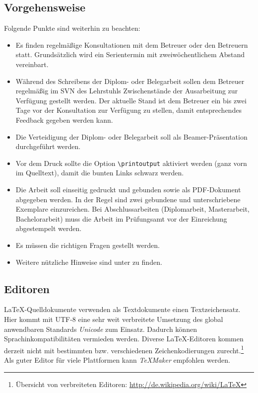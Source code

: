 \subsection{Vorgehensweise}
Folgende Punkte sind weiterhin zu beachten:
\begin{itemize}
	\item Es finden regelmäßige Konsultationen mit dem Betreuer oder den Betreuern statt. Grundsätzlich wird ein Serientermin mit zweiwöchentlichem Abstand vereinbart.
	\item Während des Schreibens der Diplom- oder Belegarbeit sollen dem Betreuer regelmäßig im \gls{SVN} des Lehrstuhls Zwischenstände der Ausarbeitung zur Verfügung gestellt werden. Der aktuelle Stand ist dem Betreuer ein bis zwei Tage vor der Konsultation zur Verfügung zu stellen, damit entsprechendes Feedback gegeben werden kann.
	\item Die Verteidigung der Diplom- oder Belegarbeit soll als Beamer-Präsentation durchgeführt werden.
	\item Vor dem Druck sollte die Option \texttt{\textbackslash{}printoutput} aktiviert werden (ganz vorn im Quelltext), damit die bunten Links schwarz werden.
	\item Die Arbeit soll einseitig gedruckt und gebunden sowie als PDF-Dokument abgegeben werden. In der Regel sind zwei gebundene und unterschriebene Exemplare einzureichen. Bei Abschlussarbeiten (Diplomarbeit, Masterarbeit, Bachelorarbeit) muss die Arbeit im Prüfungsamt vor der Einreichung abgestempelt werden.
	\item Es müssen die richtigen Fragen \cite{smartquestions} gestellt werden.
	\item Weitere nützliche Hinweise sind unter \cite{seusdiplomfaq} zu finden.
\end{itemize}

\subsection{Editoren}
\LaTeX{}-Quelldokumente verwenden als Textdokumente einen Textzeichensatz. Hier kommt mit UTF-8 eine sehr weit verbreitete Umsetzung des global anwendbaren Standards \emph{Unicode} zum Einsatz. Dadurch können Sprachinkompatibilitäten vermieden werden. Diverse \LaTeX{}-Editoren kommen derzeit nicht mit bestimmten bzw. verschiedenen Zeichenkodierungen zurecht.\footnote{Übersicht von verbreiteten Editoren: \url{http://de.wikipedia.org/wiki/LaTeX}} Als guter Editor für viele Plattformen kann \emph{TeXMaker} empfohlen werden.